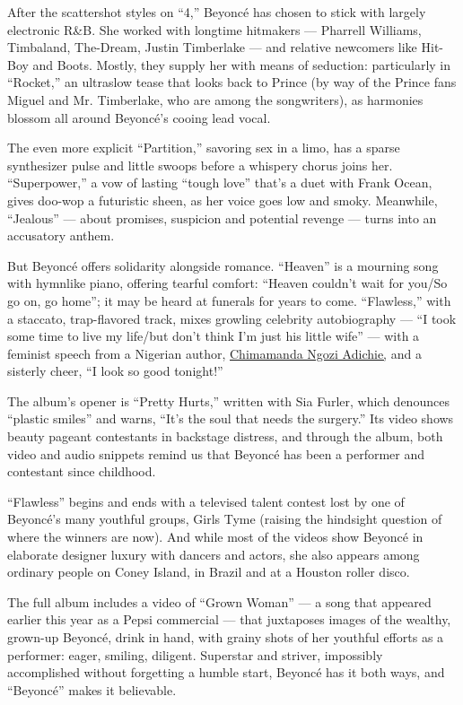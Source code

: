 After the scattershot styles on ``4,'' Beyoncé has chosen to stick with
largely electronic R\&B. She worked with longtime hitmakers --- Pharrell
Williams, Timbaland, The-Dream, Justin Timberlake --- and relative
newcomers like Hit-Boy and Boots. Mostly, they supply her with means of
seduction: particularly in ``Rocket,'' an ultraslow tease that looks
back to Prince (by way of the Prince fans Miguel and Mr. Timberlake, who
are among the songwriters), as harmonies blossom all around Beyoncé's
cooing lead vocal.

The even more explicit ``Partition,'' savoring sex in a limo, has a
sparse synthesizer pulse and little swoops before a whispery chorus
joins her. ``Superpower,'' a vow of lasting ``tough love'' that's a duet
with Frank Ocean, gives doo-wop a futuristic sheen, as her voice goes
low and smoky. Meanwhile, ``Jealous'' --- about promises, suspicion and
potential revenge --- turns into an accusatory anthem.

But Beyoncé offers solidarity alongside romance. ``Heaven'' is a
mourning song with hymnlike piano, offering tearful comfort: ``Heaven
couldn't wait for you/So go on, go home''; it may be heard at funerals
for years to come. ``Flawless,'' with a staccato, trap-flavored track,
mixes growling celebrity autobiography --- ``I took some time to live my
life/but don't think I'm just his little wife'' --- with a feminist
speech from a Nigerian author, \href{http://chimamanda.com/}{Chimamanda
Ngozi Adichie,} and a sisterly cheer, ``I look so good tonight!''

The album's opener is ``Pretty Hurts,'' written with Sia Furler, which
denounces ``plastic smiles'' and warns, ``It's the soul that needs the
surgery.'' Its video shows beauty pageant contestants in backstage
distress, and through the album, both video and audio snippets remind us
that Beyoncé has been a performer and contestant since childhood.

``Flawless'' begins and ends with a televised talent contest lost by one
of Beyoncé's many youthful groups, Girls Tyme (raising the hindsight
question of where the winners are now). And while most of the videos
show Beyoncé in elaborate designer luxury with dancers and actors, she
also appears among ordinary people on Coney Island, in Brazil and at a
Houston roller disco.

The full album includes a video of ``Grown Woman'' --- a song that
appeared earlier this year as a Pepsi commercial --- that juxtaposes
images of the wealthy, grown-up Beyoncé, drink in hand, with grainy
shots of her youthful efforts as a performer: eager, smiling, diligent.
Superstar and striver, impossibly accomplished without forgetting a
humble start, Beyoncé has it both ways, and ``Beyoncé'' makes it
believable.

